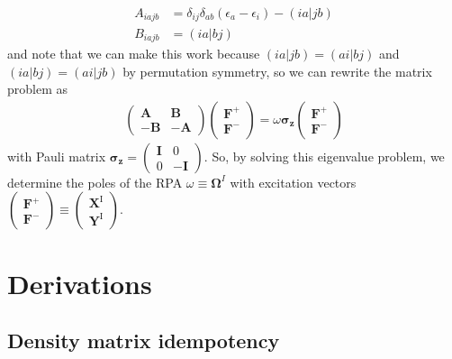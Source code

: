 \documentclass[12pt]{article}
\begin{document}
\begin{align}
    A_{i a j b} &= \delta_{i j} \delta_{a b} \left(\epsilon_{a} - \epsilon_{i}\right) - (i a | j b) \\
    B_{i a j b} &= (i a | b j)
\end{align}
and note that we can make this work because $(ia|jb)=(ai|bj)$ and $(ia|bj)=(ai|jb)$ by permutation symmetry, so we can rewrite the matrix problem as
\begin{align}
    \begin{pmatrix}
        \mathbf{A} & \mathbf{B} \\
        -\mathbf{B} & -\mathbf{A}
    \end{pmatrix}
\begin{pmatrix}
    \mathbf{F}^{+} \\
    \mathbf{F}^{-}
\end{pmatrix} = \omega \mathbf{\sigma_z}
\begin{pmatrix}
    \mathbf{F}^{+} \\
    \mathbf{F}^{-}
\end{pmatrix}
\end{align}
with Pauli matrix $\mathbf{\sigma_z}=\begin{pmatrix}
    \mathbf{I} & 0 \\
    0 & -\mathbf{I}
\end{pmatrix}$.
So, by solving this eigenvalue problem, we determine the poles of the RPA $\omega \equiv\mathbf{\Omega}^I$ with excitation vectors $\begin{pmatrix}
    \mathbf{F}^{+} \\
    \mathbf{F}^{-}
\end{pmatrix} \equiv \begin{pmatrix}
    \mathbf{X}^{\mathrm{I}} \\
    \mathbf{Y}^{\mathrm{I}}
\end{pmatrix}$. 

\appendix
\section{Derivations}
\subsection{Density matrix idempotency}
\label{sec:density_matrix_idempotency}
\end{document}
